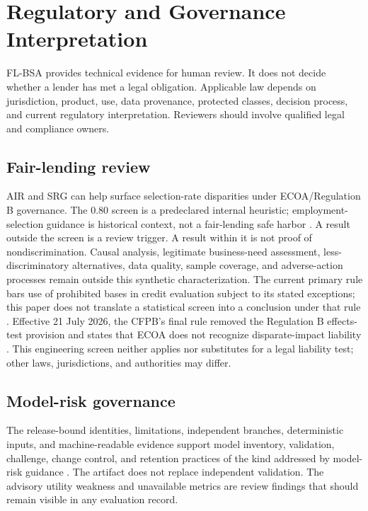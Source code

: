 \section{Regulatory and Governance Interpretation}

FL-BSA provides technical evidence for human review. It does not decide whether a lender has met a
legal obligation. Applicable law depends on jurisdiction, product, use, data provenance, protected
classes, decision process, and current regulatory interpretation. Reviewers should involve qualified
legal and compliance owners.

\subsection{Fair-lending review}

AIR and SRG can help surface selection-rate disparities under ECOA/Regulation B governance. The 0.80
screen is a predeclared internal heuristic; employment-selection guidance is historical context,
not a fair-lending safe harbor \citep{eeoc_uniform_guidelines}. A result outside the screen is a
review trigger. A result within it is not proof of nondiscrimination. Causal analysis, legitimate
business-need assessment, less-discriminatory alternatives, data quality, sample coverage, and
adverse-action processes remain outside this synthetic characterization. The current primary rule
bars use of prohibited bases in credit evaluation subject to its stated exceptions; this paper does
not translate a statistical screen into a conclusion under that rule \citep{ecfr_regb_1002_6}.
Effective 21 July 2026, the CFPB's final rule removed the Regulation B effects-test provision and
states that ECOA does not recognize disparate-impact liability \citep{cfpb_regb_2026}. This
engineering screen neither applies nor substitutes for a legal liability test; other laws,
jurisdictions, and authorities may differ.

\subsection{Model-risk governance}

The release-bound identities, limitations, independent branches, deterministic inputs, and
machine-readable evidence support model inventory, validation, challenge, change control, and
retention practices of the kind addressed by model-risk guidance \citep{sr26_2}. The artifact does
not replace independent validation. The advisory utility weakness and unavailable metrics are
review findings that should remain visible in any evaluation record.

